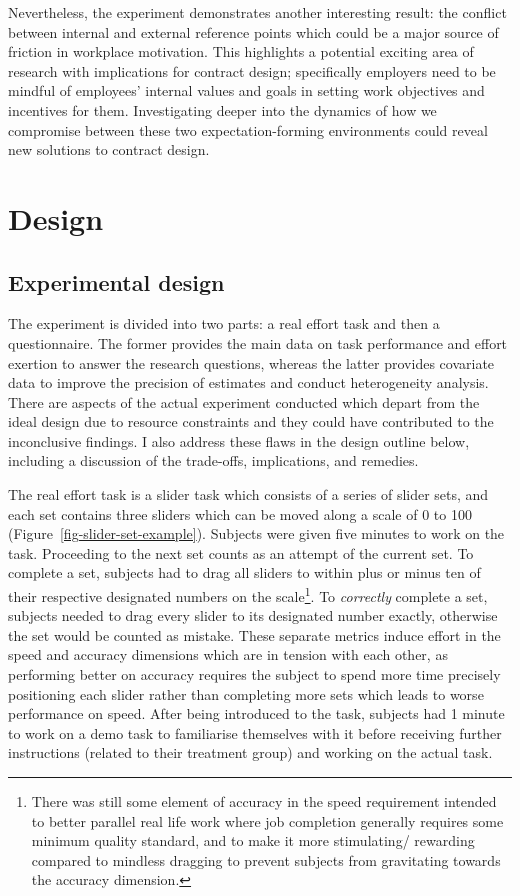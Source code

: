 \documentclass[
  12,
  letterpaper,
  DIV=11,
  numbers=noendperiod]{scrartcl}
\begin{document}
Nevertheless, the experiment demonstrates another interesting result:
the conflict between internal and external reference points which could
be a major source of friction in workplace motivation. This highlights a
potential exciting area of research with implications for contract
design; specifically employers need to be mindful of employees' internal
values and goals in setting work objectives and incentives for them.
Investigating deeper into the dynamics of how we compromise between
these two expectation-forming environments could reveal new solutions to
contract design.

\section{Design}\label{design}

\subsection{Experimental design}\label{experimental-design}

The experiment is divided into two parts: a real effort task and then a
questionnaire. The former provides the main data on task performance and
effort exertion to answer the research questions, whereas the latter
provides covariate data to improve the precision of estimates and
conduct heterogeneity analysis. There are aspects of the actual
experiment conducted which depart from the ideal design due to resource
constraints and they could have contributed to the inconclusive
findings. I also address these flaws in the design outline below,
including a discussion of the trade-offs, implications, and remedies.

The real effort task is a slider task which consists of a series of
slider sets, and each set contains three sliders which can be moved
along a scale of 0 to 100 (Figure~\ref{fig-slider-set-example}).
Subjects were given five minutes to work on the task. Proceeding to the
next set counts as an attempt of the current set. To complete a set,
subjects had to drag all sliders to within plus or minus ten of their
respective designated numbers on the scale\footnote{There was still some
  element of accuracy in the speed requirement intended to better
  parallel real life work where job completion generally requires some
  minimum quality standard, and to make it more stimulating/ rewarding
  compared to mindless dragging to prevent subjects from gravitating
  towards the accuracy dimension.}. To \emph{correctly} complete a set,
subjects needed to drag every slider to its designated number exactly,
otherwise the set would be counted as mistake. These separate metrics
induce effort in the speed and accuracy dimensions which are in tension
with each other, as performing better on accuracy requires the subject
to spend more time precisely positioning each slider rather than
completing more sets which leads to worse performance on speed. After
being introduced to the task, subjects had 1 minute to work on a demo
task to familiarise themselves with it before receiving further
instructions (related to their treatment group) and working on the
actual task.
\end{document}
